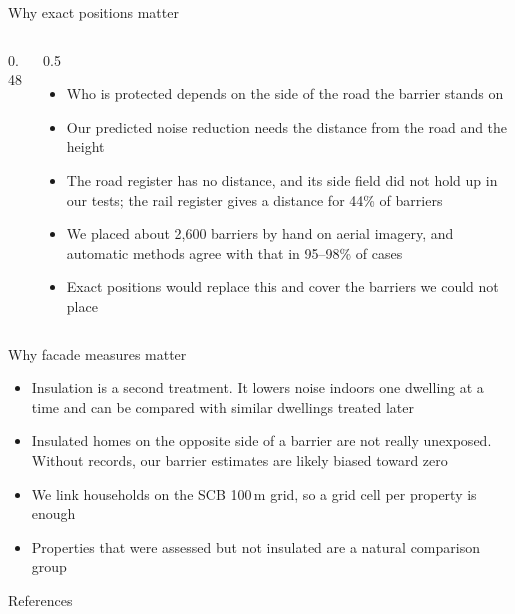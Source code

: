 \documentclass[aspectratio=169, 10pt]{beamer}
\newcommand{\house}[3][black!45]{%
  \fill[#1] (#2-0.17,#3) rectangle (#2+0.17,#3+0.25);
  \fill[#1] (#2-0.22,#3+0.25) -- (#2,#3+0.43) -- (#2+0.22,#3+0.25) -- cycle;}
\begin{document}
\begin{frame}{Why exact positions matter}
\begin{columns}[c]
\begin{column}{0.48\textwidth}
\centering
{}
\end{column}
\begin{column}{0.5\textwidth}
\small
\begin{itemize}
  \item Who is protected depends on the side of the road the barrier stands on
  \item Our predicted noise reduction needs the distance from the road and the height
  \item The road register has no distance, and its side field did not hold up in our tests; the
    rail register gives a distance for 44\% of barriers
  \item We placed about 2,600 barriers by hand on aerial imagery, and automatic methods agree
    with that in 95--98\% of cases
  \item Exact positions would replace this and cover the barriers we could not place
\end{itemize}
\end{column}
\end{columns}
\end{frame}

\begin{frame}{Why facade measures matter}
\begin{itemize}
  \item Insulation is a second treatment. It lowers noise indoors one dwelling at a time and can
    be compared with similar dwellings treated later
    \parencite[as in][]{lindgrenSoundInvestmentTraffic2021}
  \item Insulated homes on the opposite side of a barrier are not really unexposed. Without
    records, our barrier estimates are likely biased toward zero
  \item We link households on the SCB 100\,m grid, so a grid cell per property is enough
  \item Properties that were assessed but not insulated are a natural comparison group
\end{itemize}
\end{frame}

\begin{frame}[allowframebreaks]{References}
\scriptsize
\printbibliography[heading=none]
\end{frame}
\end{document}
